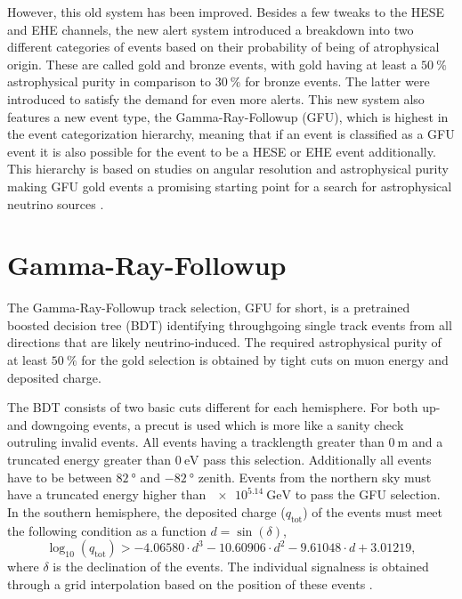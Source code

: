 However, this old system has been improved.
Besides a few tweaks to the HESE and EHE channels, the new alert system introduced a breakdown into two different categories of events based on their probability of being of atrophysical origin.
These are called gold and bronze events, with gold having at least a $\SI{50}{\percent}$ astrophysical purity in comparison to $\SI{30}{\percent}$ for bronze events.
The latter were introduced to satisfy the demand for even more alerts.
This new system also features a new event type, the Gamma-Ray-Followup (GFU), which is highest in the event categorization hierarchy, meaning that if an event is classified as a GFU event it is also possible for the event to be a HESE or EHE event additionally.
This hierarchy is based on studies on angular resolution and astrophysical purity making GFU gold events a promising starting point for a search for astrophysical neutrino sources \cite{Aartsen_2017}.

\section{Gamma-Ray-Followup}

The Gamma-Ray-Followup track selection, GFU for short, is a pretrained boosted decision tree (BDT) identifying throughgoing single track events from all directions that are likely neutrino-induced.
The required astrophysical purity of at least $\SI{50}{\percent}$ for the gold selection is obtained by tight cuts on muon energy and deposited charge.

The BDT consists of two basic cuts different for each hemisphere.
For both up- and downgoing events, a precut is used which is more like a sanity check outruling invalid events.
All events having a tracklength greater than $\SI{0}{\meter}$ and a truncated energy greater than $\SI{0}{\electronvolt}$ pass this selection.
Additionally all events have to be between $\SI{82}{\degree}$ and $\SI{-82}{\degree}$ zenith.
Events from the northern sky must have a truncated energy higher than $\SI{e5.14}{\giga\electronvolt}$ to pass the GFU selection.
In the southern hemisphere, the deposited charge ($q_\text{tot}$) of the events must meet the following condition as a function $d=\sin{(\delta)}$,
\begin{equation}
  \log_{10}(q_\text{tot}) > -4.06580\cdot d^3 - 10.60906\cdot d^2  -9.61048\cdot d + 3.01219,
\end{equation}
where $\delta$ is the declination of the events.
The individual signalness is obtained through a grid interpolation based on the position of these events \cite{track_alert_paper}.


